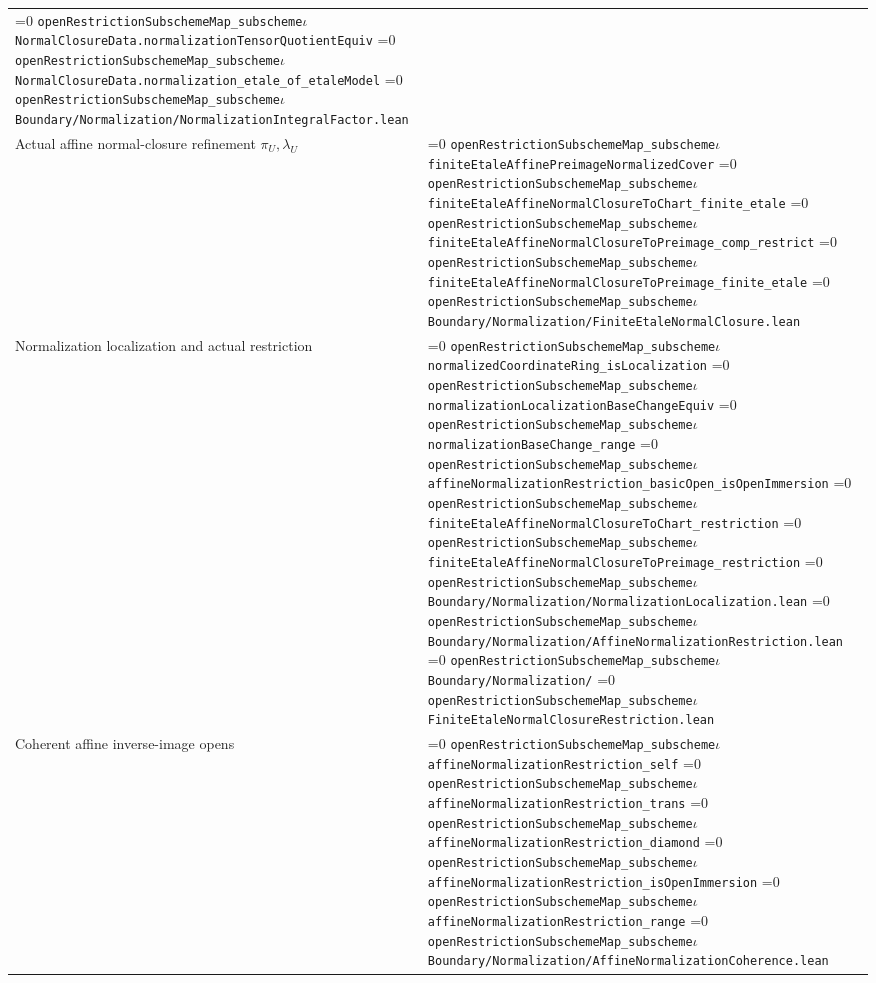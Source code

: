\documentclass[11pt]{article}
\theoremstyle{definition}
\theoremstyle{remark}
\newcommand{\leanpath}[1]{%
  \ifnum\pdfstrcmp{\detokenize{#1}}%
      {\detokenize{openRestrictionSubschemeMap_subschemeι}}=0
    \texttt{\nolinkurl{openRestrictionSubschemeMap_subscheme}}\ensuremath{\iota}%
  \else
    \texttt{\nolinkurl{#1}}%
  \fi}
\begin{document}
\begin{longtable}{@{}>{\raggedright\arraybackslash}p{}
                >{\raggedright\arraybackslash}p{}@{}}
\leanpath{NormalClosureData.normalizationTensorQuotientEquiv}\newline
\leanpath{NormalClosureData.normalization_etale_of_etaleModel}\newline
\leanpath{Boundary/Normalization/NormalizationIntegralFactor.lean}\\
Actual affine normal-closure refinement \(\pi_U,\lambda_U\) &
\leanpath{finiteEtaleAffinePreimageNormalizedCover}\newline
\leanpath{finiteEtaleAffineNormalClosureToChart_finite_etale}\newline
\leanpath{finiteEtaleAffineNormalClosureToPreimage_comp_restrict}\newline
\leanpath{finiteEtaleAffineNormalClosureToPreimage_finite_etale}\newline
\leanpath{Boundary/Normalization/FiniteEtaleNormalClosure.lean}\\
Normalization localization and actual restriction &
\leanpath{normalizedCoordinateRing_isLocalization}\newline
\leanpath{normalizationLocalizationBaseChangeEquiv}\newline
\leanpath{normalizationBaseChange_range}\newline
\leanpath{affineNormalizationRestriction_basicOpen_isOpenImmersion}\newline
\leanpath{finiteEtaleAffineNormalClosureToChart_restriction}\newline
\leanpath{finiteEtaleAffineNormalClosureToPreimage_restriction}\newline
\leanpath{Boundary/Normalization/NormalizationLocalization.lean}\newline
\leanpath{Boundary/Normalization/AffineNormalizationRestriction.lean}\newline
\leanpath{Boundary/Normalization/}\newline
\leanpath{FiniteEtaleNormalClosureRestriction.lean}\\
Coherent affine inverse-image opens &
\leanpath{affineNormalizationRestriction_self}\newline
\leanpath{affineNormalizationRestriction_trans}\newline
\leanpath{affineNormalizationRestriction_diamond}\newline
\leanpath{affineNormalizationRestriction_isOpenImmersion}\newline
\leanpath{affineNormalizationRestriction_range}\newline
\leanpath{Boundary/Normalization/AffineNormalizationCoherence.lean}\newline

\end{longtable}
\end{document}
